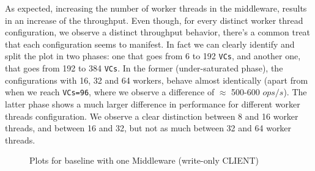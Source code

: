 \documentclass[11pt,a4paper]{article}
\begin{document}
As expected, increasing the number of worker threads in the middleware, results in an increase of the throughput. Even though, for every distinct worker thread configuration, we observe a distinct throughput behavior, there's a common treat that each configuration seems to manifest. In fact we can clearly identify and split the plot in two phases: one that goes from 6 to 192 \texttt{VCs}, and another one, that goes from 192 to 384 \texttt{VCs}. 
In the former (under-saturated phase), the configurations with 16, 32 and 64 workers, behave almost identically (apart from when we reach \texttt{VCs=96}, where we observe a difference of $\approx$ 500-600 $ops/s$).
The latter phase shows a much larger difference in performance for different worker threads configuration. We observe a clear distinction between 8 and 16 worker threads, and between 16 and 32, but not as much between 32 and 64 worker threads. 

\begin{figure}[!h]
  \centering
  \caption{Plots for baseline with one Middleware (write-only CLIENT)}
  \label{fig:baseline_mw_1_mw_mt_wo}
\end{figure}
\end{document}

